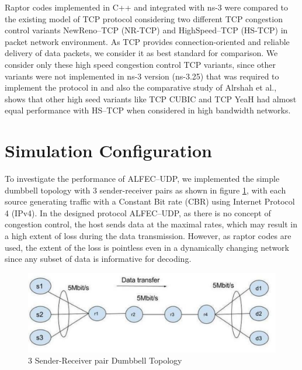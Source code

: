 \hspace{\parindent}Raptor codes implemented in C++ and integrated with ns-3 were compared to the existing model of TCP protocol considering two different TCP congestion control variants NewReno--TCP (NR-TCP) and HighSpeed--TCP (HS-TCP) in packet network environment. As TCP provides connection-oriented and reliable delivery of data packets, we consider it as best standard for comparison. We consider only these high speed congestion control TCP variants, since other variants were not implemented in ns-3 version (ns-3.25) that was required to implement the protocol in and also the comparative study of Alrshah et al., \cite{alrshah2014comparative} shows that other high seed variants like TCP CUBIC and TCP YeaH had almost equal performance with HS--TCP when considered in high bandwidth networks.

\section{Simulation Configuration}
To investigate the performance of ALFEC--UDP, we implemented the simple dumbbell topology with 3 sender-receiver pairs as shown in figure \ref{dumb}, with each source generating traffic with a Constant Bit rate (CBR) using Internet Protocol 4 (IPv4). In the designed protocol ALFEC--UDP, as there is no concept of congestion control, the host sends data at the maximal rates, which may result in a high extent of loss during the data transmission. However, as raptor codes are used, the extent of the loss is pointless even in a dynamically changing network since any subset of data is informative for decoding.

\begin{figure}[htbp]
\label{dumb}
\begin{center}
\includegraphics[width=5.5in]{Figures/dumbbell}
\caption{3 Sender-Receiver pair Dumbbell Topology}
\end{center}
\end{figure}
\noindent

